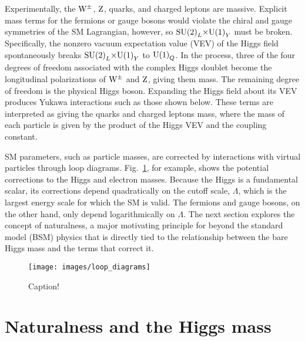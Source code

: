 \documentclass[12pt]{article}
\begin{document}
    Experimentally, the $\mathrm{W}^\pm$, $\mathrm{Z}$, quarks, and charged leptons are massive. Explicit mass terms for the fermions or gauge bosons would violate the chiral and gauge symmetries of the SM Lagrangian, however, so $\mathrm{SU} {{\left(2\right)}}_L {\times} \mathrm{U} {\left(1\right)}_Y$ must be broken. Specifically, the nonzero vacuum expectation value (VEV) of the Higgs field spontaneously breaks $\mathrm{SU} {{\left(2\right)}}_L {\times} \mathrm{U} {\left(1\right)}_Y$ to $\mathrm{U} {\left(1\right)}_Q$. In the process, three of the four degrees of freedom associated with the complex Higgs doublet become the longitudinal polarizations of $\mathrm{W}^\pm$ and $\mathrm{Z}$, giving them mass. The remaining degree of freedom is the physical Higgs boson. Expanding the Higgs field about its VEV produces Yukawa interactions such as those shown below. These terms are interpreted as giving the quarks and charged leptons mass, where the mass of each particle is given by the product of the Higgs VEV and the coupling constant.


    SM parameters, such as particle masses, are corrected by interactions with virtual particles through loop diagrams. Fig.~\ref{loop_diagrams}, for example, shows the potential corrections to the Higgs and electron masses. Because the Higgs is a fundamental scalar, its corrections depend quadratically on the cutoff scale, $\Lambda$, which is the largest energy scale for which the SM is valid. The fermions and gauge bosons, on the other hand, only depend logarithmically on $\Lambda$. The next section explores the concept of naturalness, a major motivating principle for beyond the standard model (BSM) physics that is directly tied to the relationship between the bare Higgs mass and the terms that correct it.

    \noindent \begin{figure}[htbp] \begin{center}
    \texttt{[image: images/loop\_diagrams]}
    \caption{Caption!}
    \label{loop_diagrams}
    \end{center} \end{figure}

\section{Naturalness and the Higgs mass}
\end{document}
